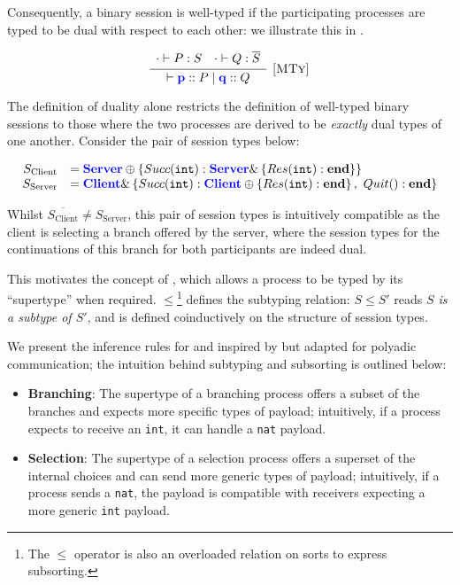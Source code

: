 Consequently, a binary session is well-typed if the participating processes are typed to be dual with respect to each other: we illustrate this in .


$$
\infer[\mbox{\rulename{MTy}}]{
	\vdash \parti{p} :: P \mid 
	\parti{q} :: Q
}{
	\begin{array}{lr}
	\cdot \vdash P: S
	&
	\cdot \vdash Q: \overline{S}
	\end{array}
}
$$

The definition of duality alone restricts the definition of well-typed binary sessions to those where the two processes are derived to be \textit{exactly} dual types of one another. Consider the pair of session types below:

$$
\begin{array}{rl}
S_{\text{Client}} &= {\color{blue}\mathbf{Server}} \oplus \left\{Succ(\texttt{int}): {\color{blue}\mathbf{Server}} \& \left\{Res(\texttt{int}): \mathbf{end}\right\}\right\} \\
S_{\text{Server}} &= {\color{blue}\mathbf{Client}} \& \left\{Succ(\texttt{int}): {\color{blue}\mathbf{Client}} \oplus \left\{Res(\texttt{int}): \mathbf{end}\right\},~Quit(): \mathbf{end}\right\}
\end{array}
$$

Whilst $\overline{S_{\text{Client}}} \neq S_{\text{Server}}$, this pair of session types is intuitively compatible as the client is selecting a branch offered by the server, where the session types for the continuations of this branch for both participants are indeed dual.

This motivates the concept of , which allows a process to be typed by its ``supertype'' when required. $\leqslant$\footnote{The $\leqslant$ operator is also an overloaded relation on sorts to express subsorting.} defines the subtyping relation: $S \leqslant S'$ reads \textit{$S$ is a subtype of $S'$}, and is defined coinductively on the structure of session types.

We present the inference rules for  and  inspired by \cite{MPST} but adapted for polyadic communication; the intuition behind subtyping and subsorting is outlined below:

\begin{itemize}
\item \textbf{Branching}: The supertype of a branching process offers a subset of the branches and expects more specific types of payload; intuitively, if a process expects to receive an \texttt{int}, it can handle a \texttt{nat} payload.
\item \textbf{Selection}: The supertype of a selection process offers a superset of the internal choices and can send more generic types of payload; intuitively, if a process sends a \texttt{nat}, the payload is compatible with receivers expecting a more generic \texttt{int} payload.
\end{itemize}

